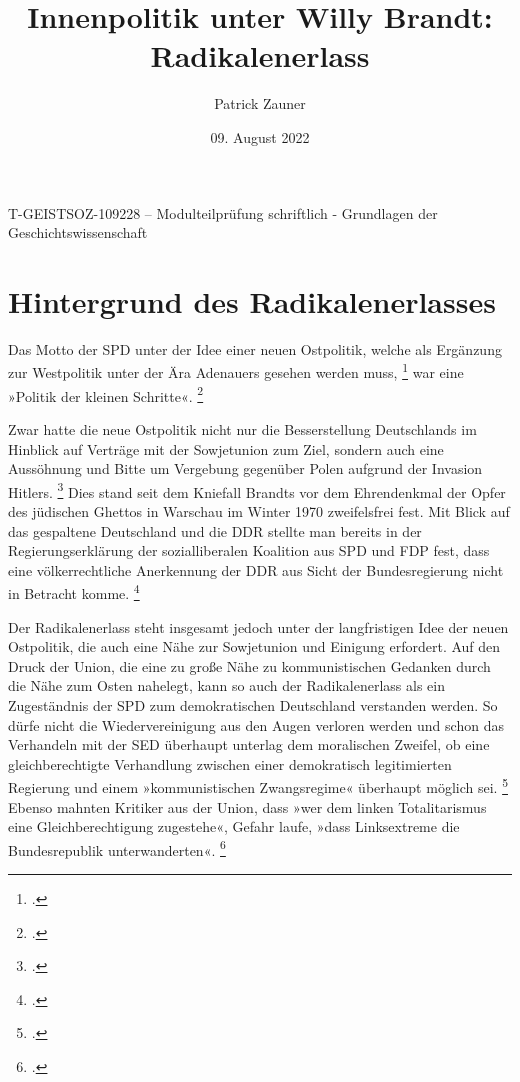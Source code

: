 \documentclass[12pt]{scrartcl}
\begin{document}
\begin{titlepage}
    \title{Innenpolitik unter Willy Brandt: Radikalenerlass}
    \date{09. August 2022}
    \author{Patrick Zauner}
    \maketitle
    \begin{center}
    T-GEISTSOZ-109228 – Modulteilprüfung schriftlich - Grundlagen der Geschichtswissenschaft
    \end{center}
    \thispagestyle{empty}
\end{titlepage}

\tableofcontents
\setcounter{page}{1}

\newpage


\section{Hintergrund des Radikalenerlasses}

Das Motto der SPD unter der Idee einer neuen Ostpolitik, welche als Ergänzung zur Westpolitik unter der Ära Adenauers gesehen werden muss, \footcite[][S. 357]{gebhardt_handbuch_2001} war eine »Politik der kleinen Schritte«. \footcite[][S. 358]{gebhardt_handbuch_2001}

Zwar hatte die neue Ostpolitik nicht nur die Besserstellung Deutschlands im Hinblick auf Verträge mit der Sowjetunion zum Ziel, sondern auch eine Aussöhnung und Bitte um Vergebung gegenüber Polen aufgrund der Invasion Hitlers. \footcite[][S. 378f]{gebhardt_handbuch_2001} Dies stand seit dem Kniefall Brandts vor dem Ehrendenkmal der Opfer des jüdischen Ghettos in Warschau im Winter 1970 zweifelsfrei fest. Mit Blick auf das gespaltene Deutschland und die DDR stellte man bereits in der Regierungserklärung der sozialliberalen Koalition aus SPD und FDP fest, dass eine völkerrechtliche Anerkennung der DDR aus Sicht der Bundesregierung nicht in Betracht komme. \footcite[][S. 33]{rodder_bundesrepublik_2004}


Der Radikalenerlass steht insgesamt jedoch unter der langfristigen Idee der neuen Ostpolitik, die auch eine Nähe zur Sowjetunion und Einigung erfordert. Auf den Druck der Union, die eine zu große Nähe zu kommunistischen Gedanken durch die Nähe zum Osten nahelegt, kann so auch der Radikalenerlass als ein Zugeständnis der SPD zum demokratischen Deutschland verstanden werden. So dürfe nicht die Wiedervereinigung aus den Augen verloren werden und schon das Verhandeln mit der SED überhaupt unterlag dem moralischen Zweifel, ob eine gleichberechtigte Verhandlung zwischen einer demokratisch legitimierten Regierung und einem »kommunistischen Zwangsregime« überhaupt möglich sei. \footcite[][S. 387]{gebhardt_handbuch_2001}
Ebenso mahnten Kritiker aus der Union, dass »wer dem linken Totalitarismus eine Gleichberechtigung zugestehe«, Gefahr laufe, »dass Linksextreme die Bundesrepublik unterwanderten«. \footcite[][S. 387]{gebhardt_handbuch_2001}
\end{document}
